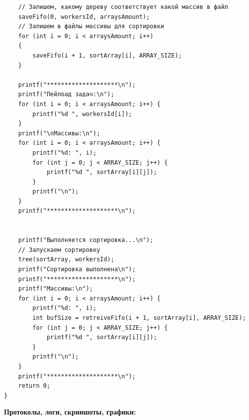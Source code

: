 \documentclass[a4paper,14pt]{extarticle}
\begin{document}
\begin{verbatim}
    // Запишем, какому дереву соответствует какой массив в файл
    saveFifo(0, workersId, arraysAmount);
    // Запишем в файлы массивы для сортировки
    for (int i = 0; i < arraysAmount; i++)
    {
        saveFifo(i + 1, sortArray[i], ARRAY_SIZE);
    }

    printf("********************\n");
    printf("Пейлоад задач:\n");
    for (int i = 0; i < arraysAmount; i++) {
        printf("%d ", workersId[i]);
    }
    printf("\nМассивы:\n");
    for (int i = 0; i < arraysAmount; i++) {
        printf("%d: ", i);
        for (int j = 0; j < ARRAY_SIZE; j++) {
            printf("%d ", sortArray[i][j]);
        }
        printf("\n");
    }
    printf("********************\n");


    printf("Выполняется сортировка...\n");
    // Запускаем сортировку
    tree(sortArray, workersId);
    printf("Сортировка выполнена\n");
    printf("********************\n");
    printf("Массивы:\n");
    for (int i = 0; i < arraysAmount; i++) {
        printf("%d: ", i);
        int bufSize = retreiveFifo(i + 1, sortArray[i], ARRAY_SIZE);
        for (int j = 0; j < ARRAY_SIZE; j++) {
            printf("%d ", sortArray[i][j]);
        }
        printf("\n");
    }
    printf("********************\n");
    return 0;
}
\end{verbatim}

\textbf{Протоколы, логи, скриншоты, графики:}\bigbreak
\end{document}
